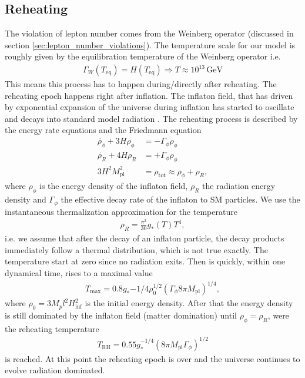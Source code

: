 \documentclass[13pt,a4paper,twoside,titlepage]{article}
\begin{document}
\subsection{Reheating}
\label{sec:reheating}
The violation of lepton number comes from the Weinberg operator (discussed in section \ref{sec:lepton_number_violations}).
The temperature scale for our model is roughly given by the equilibration temperature of the Weinberg operator i.e.
\begin{align}
    \Gamma_W(T_\mathrm{eq}) = H(T_\mathrm{eq}) \Rightarrow T \approx 10^{13} \, \mathrm{GeV}
\end{align}
This means this process has to happen during/directly after reheating. The reheating epoch happens right after inflation. The inflaton field, that has driven by exponential expansion of the universe during inflation has started to oscillate and decays into standard model radiation  \cite[sec. 8.3]{the_early_universe_kolb_and_turner}.
The reheating process is described by the energy rate equations and the Friedmann equation \cite[eq. 8.29, 8.31]{the_early_universe_kolb_and_turner}
\begin{align}
    \label{eq:reheating_equations}
    \dot{\rho_\phi} + 3 H \rho_\phi &= - \Gamma_\phi \rho_\phi \\
    \dot{\rho_R} + 4 H \rho_R &= + \Gamma_\phi \rho_\phi \\
    3 H^2 M_\mathrm{pl}^2 &= \rho_\mathrm{tot} \approx \rho_\phi + \rho_R,
\end{align}
where $\rho_\phi$ is the energy density of the inflaton field, $\rho_R$ the radiation energy density and $\Gamma_\phi$ the effective decay rate of the inflaton to SM particles.
We use the instantaneous thermalization approximation for the temperature
\begin{align}
    \rho_R = \frac{\pi^2}{30} g_{*}(T) T^4,
\end{align}
i.e. we assume that after the decay of an inflaton particle, the decay products immediately follow a thermal distribution, which is not true exactly.
The temperature start at zero since no radiation exits. Then is quickly, within one dynamical time, rises to a maximal
value \cite[eq. 8.33]{the_early_universe_kolb_and_turner}
\begin{align}
    T_\mathrm{max} = 0.8 g_*{-1/4} \rho_0^{1/2} (\Gamma_\phi 8 \pi M_\mathrm{pl})^{1/4},
\end{align}
where $\rho_0 = 3 M_pl^2 H_\mathrm{inf}^2$ is the initial energy density.
After that the energy density is still dominated by the inflaton field (matter domination) until
$\rho_\phi = \rho_R$, were the reheating temperature \cite[eq. 8.34]{the_early_universe_kolb_and_turner}
\begin{align}
    T_\mathrm{RH} = 0.55 g_*^{-1/4} (8 \pi M_\mathrm{pl} \Gamma_\phi)^{1/2}
\end{align}
is reached. At this point the reheating epoch is over and the universe continues to evolve radiation dominated.
\end{document}
